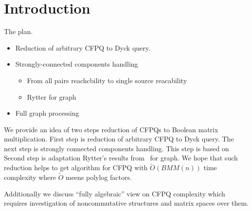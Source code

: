 \section{Introduction}

The plan.
\begin{itemize}
\item Reduction of arbitrary CFPQ to Dyck query.
\item Strongly-connected components handling
\begin{itemize}
  \item From all pairs reachcbility to single source reacability
  \item Rytter for graph
\end{itemize}

\item Full graph processing
\end{itemize}

We provide an idea of two steps reduction of CFPQs to Boolean matrix multiplication.
First step is reduction of arbitrary CFPQ to Dyck query.
The next step is strongly connected components handling.
This step is based on 
Second step is adaptation Rytter's results from~\cite{Rytter} for graph.
We hope that such reduction helps to get algorithm for CFPQ with $\widetilde{O}(BMM(n))$ time complexity where $\widetilde{O}$ meens polylog factors.

Additionally we discuss ``fully algebraic'' view on CFPQ complexity which requires investigation of noncommutative structures and matrix spaces over them.